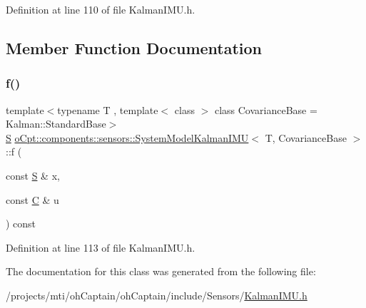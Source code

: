 Definition at line 110 of file Kalman\+I\+M\+U.\+h.



\subsection{Member Function Documentation}
\hypertarget{classo_cpt_1_1components_1_1sensors_1_1_system_model_kalman_i_m_u_ac471dd93069d4b98814254c0bc4ee7ac}{}\label{classo_cpt_1_1components_1_1sensors_1_1_system_model_kalman_i_m_u_ac471dd93069d4b98814254c0bc4ee7ac} 
\subsubsection{\texorpdfstring{f()}{f()}}
{\footnotesize\ttfamily template$<$typename T , template$<$ class $>$ class Covariance\+Base = Kalman\+::\+Standard\+Base$>$ \\
\hyperlink{classo_cpt_1_1components_1_1sensors_1_1_system_model_kalman_i_m_u_a7dde4d4af9085109c0e3021aa38f42bc}{S} \hyperlink{classo_cpt_1_1components_1_1sensors_1_1_system_model_kalman_i_m_u}{o\+Cpt\+::components\+::sensors\+::\+System\+Model\+Kalman\+I\+MU}$<$ T, Covariance\+Base $>$\+::f (\begin{DoxyParamCaption}\item[{const \hyperlink{classo_cpt_1_1components_1_1sensors_1_1_system_model_kalman_i_m_u_a7dde4d4af9085109c0e3021aa38f42bc}{S} \&}]{x,  }\item[{const \hyperlink{classo_cpt_1_1components_1_1sensors_1_1_system_model_kalman_i_m_u_a5ed9fbeaeaa5a91116615f01a44b7c78}{C} \&}]{u }\end{DoxyParamCaption}) const\hspace{0.3cm}{\ttfamily [inline]}}



Definition at line 113 of file Kalman\+I\+M\+U.\+h.



The documentation for this class was generated from the following file\+:\begin{DoxyCompactItemize}
\item 
/projects/mti/oh\+Captain/oh\+Captain/include/\+Sensors/\hyperlink{_kalman_i_m_u_8h}{Kalman\+I\+M\+U.\+h}\end{DoxyCompactItemize}
